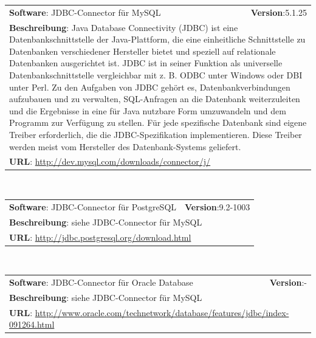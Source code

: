\begin{tabular}{p{9cm}r}
\textbf{Software}: JDBC-Connector für MySQL  & \textbf{Version}:5.1.25\\
\multicolumn{2}{p{1\textwidth}}{\textbf{Beschreibung}: Java Database Connectivity (JDBC) ist eine Datenbankschnittstelle der Java-Plattform, die eine einheitliche Schnittstelle zu Datenbanken verschiedener Hersteller bietet und speziell auf relationale Datenbanken ausgerichtet ist. JDBC ist in seiner Funktion als universelle Datenbankschnittstelle vergleichbar mit z. B. ODBC unter Windows oder DBI unter Perl. Zu den Aufgaben von JDBC gehört es, Datenbankverbindungen aufzubauen und zu verwalten, SQL-Anfragen an die Datenbank weiterzuleiten und die Ergebnisse in eine für Java nutzbare Form umzuwandeln und dem Programm zur Verfügung zu stellen. Für jede spezifische Datenbank sind eigene Treiber erforderlich, die die JDBC-Spezifikation implementieren. Diese Treiber werden meist vom Hersteller des Datenbank-Systems geliefert.}\\
\multicolumn{2}{l}{\textbf{URL}: \url{http://dev.mysql.com/downloads/connector/j/}}
\end{tabular}\\

\begin{tabular}{p{9cm}r}
\textbf{Software}: JDBC-Connector für PostgreSQL  & \textbf{Version}:9.2-1003\\
\multicolumn{2}{p{1\textwidth}}{\textbf{Beschreibung}: siehe JDBC-Connector für MySQL}\\
\multicolumn{2}{l}{\textbf{URL}: \url{http://jdbc.postgresql.org/download.html}}
\end{tabular}\\

\begin{tabular}{p{9cm}r}
\textbf{Software}: JDBC-Connector für Oracle Database & \textbf{Version}:-\\
\multicolumn{2}{p{1\textwidth}}{\textbf{Beschreibung}: siehe JDBC-Connector für MySQL}\\
\multicolumn{2}{l}{\textbf{URL}: \url{http://www.oracle.com/technetwork/database/features/jdbc/index-091264.html}}
\end{tabular}\\